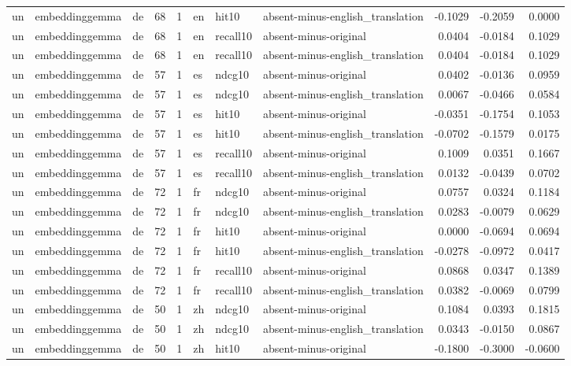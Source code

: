 \begin{tabular}{lllrrlllrrr}
un & embeddinggemma & de & 68 & 1 & en & hit10 & absent-minus-english\_translation & -0.1029 & -0.2059 & 0.0000 \\
un & embeddinggemma & de & 68 & 1 & en & recall10 & absent-minus-original & 0.0404 & -0.0184 & 0.1029 \\
un & embeddinggemma & de & 68 & 1 & en & recall10 & absent-minus-english\_translation & 0.0404 & -0.0184 & 0.1029 \\
un & embeddinggemma & de & 57 & 1 & es & ndcg10 & absent-minus-original & 0.0402 & -0.0136 & 0.0959 \\
un & embeddinggemma & de & 57 & 1 & es & ndcg10 & absent-minus-english\_translation & 0.0067 & -0.0466 & 0.0584 \\
un & embeddinggemma & de & 57 & 1 & es & hit10 & absent-minus-original & -0.0351 & -0.1754 & 0.1053 \\
un & embeddinggemma & de & 57 & 1 & es & hit10 & absent-minus-english\_translation & -0.0702 & -0.1579 & 0.0175 \\
un & embeddinggemma & de & 57 & 1 & es & recall10 & absent-minus-original & 0.1009 & 0.0351 & 0.1667 \\
un & embeddinggemma & de & 57 & 1 & es & recall10 & absent-minus-english\_translation & 0.0132 & -0.0439 & 0.0702 \\
un & embeddinggemma & de & 72 & 1 & fr & ndcg10 & absent-minus-original & 0.0757 & 0.0324 & 0.1184 \\
un & embeddinggemma & de & 72 & 1 & fr & ndcg10 & absent-minus-english\_translation & 0.0283 & -0.0079 & 0.0629 \\
un & embeddinggemma & de & 72 & 1 & fr & hit10 & absent-minus-original & 0.0000 & -0.0694 & 0.0694 \\
un & embeddinggemma & de & 72 & 1 & fr & hit10 & absent-minus-english\_translation & -0.0278 & -0.0972 & 0.0417 \\
un & embeddinggemma & de & 72 & 1 & fr & recall10 & absent-minus-original & 0.0868 & 0.0347 & 0.1389 \\
un & embeddinggemma & de & 72 & 1 & fr & recall10 & absent-minus-english\_translation & 0.0382 & -0.0069 & 0.0799 \\
un & embeddinggemma & de & 50 & 1 & zh & ndcg10 & absent-minus-original & 0.1084 & 0.0393 & 0.1815 \\
un & embeddinggemma & de & 50 & 1 & zh & ndcg10 & absent-minus-english\_translation & 0.0343 & -0.0150 & 0.0867 \\
un & embeddinggemma & de & 50 & 1 & zh & hit10 & absent-minus-original & -0.1800 & -0.3000 & -0.0600 \\

\end{tabular}
